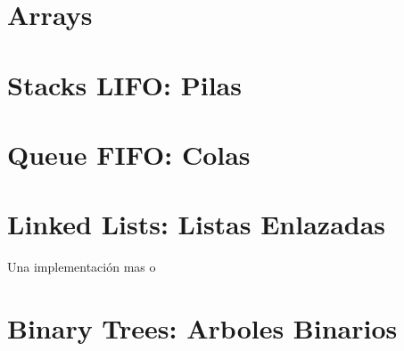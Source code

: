 \documentclass[12pt, fleqn]{report}                             %
\theoremstyle{break}                                            %
\begin{document}
    \clearpage
    \chapter{Arrays}

    \clearpage
    \chapter{Stacks LIFO: Pilas}

    \clearpage
    \chapter{Queue FIFO: Colas}

    \clearpage
    \chapter{Linked Lists: Listas Enlazadas}

        Una implementación mas o 


    \clearpage
    \chapter{Binary Trees: Arboles Binarios}
\end{document}
